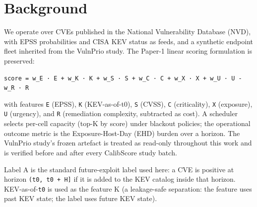 \section{Background}
We operate over CVEs published in the National Vulnerability Database (NVD), with EPSS probabilities and CISA KEV status as feeds, and a synthetic endpoint fleet inherited from the VulnPrio study. The Paper-1 linear scoring formulation is preserved:

\texttt{score = w\_E · E + w\_K · K + w\_S · S + w\_C · C + w\_X · X + w\_U · U - w\_R · R}

with features \texttt{E} (EPSS), \texttt{K} (KEV-as-of-t0), \texttt{S} (CVSS), \texttt{C} (criticality), \texttt{X} (exposure), \texttt{U} (urgency), and \texttt{R} (remediation complexity, subtracted as cost). A scheduler selects per-cell capacity (top-K by score) under blackout policies; the operational outcome metric is the Exposure-Host-Day (EHD) burden over a horizon. The VulnPrio study's frozen artefact is treated as read-only throughout this work and is verified before and after every CalibScore study batch.

Label A is the standard future-exploit label used here: a CVE is positive at horizon \texttt{(t0, t0 + H]} if it is added to the KEV catalog inside that horizon. KEV-as-of-\texttt{t0} is used as the feature K (a leakage-safe separation: the feature uses past KEV state; the label uses future KEV state).
